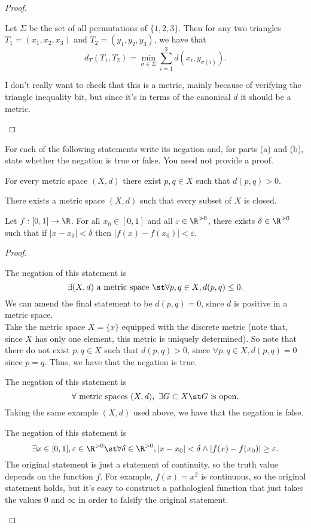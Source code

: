 \documentclass{assignment}
\begin{document}
\begin{proof}
\begin{qparts}
     Let $\Sigma$ be the set of all permutations of $\{1,2,3\}$. Then for any two triangles $T_1 = 
     (x_1, x_2, x_3)$ and $T_2 = (y_1, y_2, y_3)$, we have that 
     $$d_T(T_1, T_2) = \min_{\sigma\in\Sigma}\sum_{i=1}^3d(x_i, y_{\sigma(i)}).$$

     I don't really want to check that this is a metric, mainly because of verifying the triangle
     inequality bit, but since it's in terms of the canonical $d$ it should be a metric.
  \end{qparts}
\end{proof}

\begin{question}[3]
  For each of the following statements write its negation and, for parts (a) and (b), state whether
the negation is true or false. You need not provide a proof.
\begin{qparts}
  \item For every metric space $(X, d)$ there exist $p,q\in X$ such that $d(p,q) > 0.$
  \item There exists a metric space $(X,d)$ such that every subset of $X$ is closed.
  \item Let $f: [0,1]\to\R$. For all $x_0\in[0,1]$ and all $\varepsilon\in\R^{>0}$, there exists
$\delta\in\R^{>0}$ such that if $|x - x_0| < \delta$ then $|f(x) - f(x_0)| < \varepsilon.$
\end{qparts}
\end{question}
\begin{proof}\leavevmode
  \begin{qparts}
  \item The negation of this statement is $$\exists (X,d) \text{ a metric space } \st \forall p,q\in
    X, d(p,q) \leq 0.$$ We can amend the final statement to be $d(p,q) = 0$, since $d$ is positive in 
    a metric space. \\
    
    Take the metric space $X = \{x\}$ equipped with the discrete metric (note that, since $X$ has
    only one element, this metric is uniquely determined). So note that there do not exist $p,q\in X$
    such that $d(p,q) > 0$, since $\forall p,q \in X, d(p,q) = 0$ since $p = q$. Thus, we have that the 
    negation is true.
    
  \item The negation of this statement is $$\forall \text{ metric spaces }(X,d),\ \exists G\subset X
    \st G \text{ is open.}$$ Taking the same example $(X,d)$ used above, we have that the negation is false.

  \item The negation of this statement is $$\exists x\in[0,1], \varepsilon\in\R^{>0} \st \forall \delta
    \in\R^{>0}, |x - x_0| < \delta \wedge |f(x) - f(x_0)| \geq \varepsilon.$$ The original statement 
    is just a statement of continuity, so the truth value depends on the function $f$. For example,
    $f(x) = x^2$ is continuous, so the original statement holds, but it's easy to construct a pathological
    function that just takes the values $0$ and $\infty$ in order to falsify the original statement.
  \end{qparts}
\end{proof}
\end{document}

